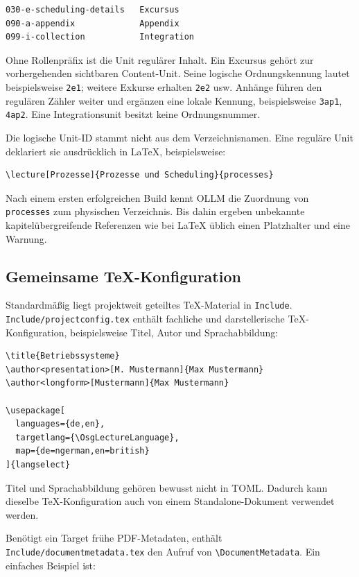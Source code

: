 \documentclass[
load-preamble+
]{osgdoc}
\begin{document}
\begin{verbatim}
030-e-scheduling-details   Excursus
090-a-appendix             Appendix
099-i-collection           Integration
\end{verbatim}

Ohne Rollenpräfix ist die Unit regulärer Inhalt. Ein Excursus gehört zur
vorhergehenden sichtbaren Content-Unit. Seine logische Ordnungskennung lautet
beispielsweise \texttt{2e1}; weitere Exkurse erhalten \texttt{2e2} usw.
Anhänge führen den regulären Zähler weiter und ergänzen eine lokale Kennung,
beispielsweise \texttt{3ap1}, \texttt{4ap2}. Eine Integrationsunit besitzt
keine Ordnungsnummer.

Die logische Unit-ID stammt nicht aus dem Verzeichnisnamen. Eine reguläre Unit
deklariert sie ausdrücklich in LaTeX, beispielsweise:

\begin{verbatim}
\lecture[Prozesse]{Prozesse und Scheduling}{processes}
\end{verbatim}

Nach einem ersten erfolgreichen Build kennt OLLM die Zuordnung von
\texttt{processes} zum physischen Verzeichnis. Bis dahin ergeben unbekannte
kapitelübergreifende Referenzen wie bei LaTeX üblich einen Platzhalter und
eine Warnung.

\subsection{Gemeinsame TeX-Konfiguration}

Standardmäßig liegt projektweit geteiltes TeX-Material in \texttt{Include}.
\texttt{Include/projectconfig.tex} enthält fachliche und darstellerische
TeX-Konfiguration, beispielsweise Titel, Autor und Sprachabbildung:

\begin{verbatim}
\title{Betriebssysteme}
\author<presentation>[M. Mustermann]{Max Mustermann}
\author<longform>[Mustermann]{Max Mustermann}

\usepackage[
  languages={de,en},
  targetlang={\OsgLectureLanguage},
  map={de=ngerman,en=british}
]{langselect}
\end{verbatim}

Titel und Sprachabbildung gehören bewusst nicht in TOML. Dadurch kann dieselbe
TeX-Konfiguration auch von einem Standalone-Dokument verwendet werden.

Benötigt ein Target frühe PDF-Metadaten, enthält
\texttt{Include/documentmetadata.tex} den Aufruf von
\verb|\DocumentMetadata|. Ein einfaches Beispiel ist:
\end{document}
